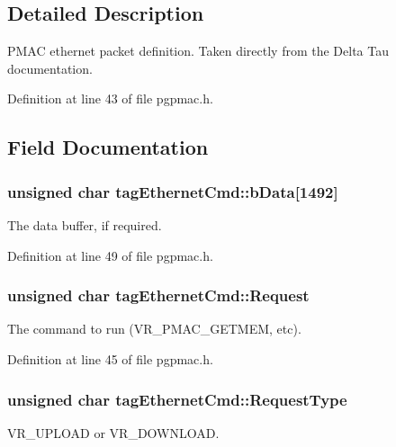\subsection{Detailed Description}
PMAC ethernet packet definition. Taken directly from the Delta Tau documentation. 

Definition at line 43 of file pgpmac.h.

\subsection{Field Documentation}
\hypertarget{structtagEthernetCmd_a872dab798127d6f589974a79c5d0aef1}{
\subsubsection[{bData}]{\setlength{\rightskip}{0pt plus 5cm}unsigned char {\bf tagEthernetCmd::bData}\mbox{[}1492\mbox{]}}}
\label{structtagEthernetCmd_a872dab798127d6f589974a79c5d0aef1}


The data buffer, if required. 

Definition at line 49 of file pgpmac.h.\hypertarget{structtagEthernetCmd_a0dc566e7edbb226f1a4ea443d93d56e2}{
\subsubsection[{Request}]{\setlength{\rightskip}{0pt plus 5cm}unsigned char {\bf tagEthernetCmd::Request}}}
\label{structtagEthernetCmd_a0dc566e7edbb226f1a4ea443d93d56e2}


The command to run (VR\_\-PMAC\_\-GETMEM, etc). 

Definition at line 45 of file pgpmac.h.\hypertarget{structtagEthernetCmd_a6a155eb3ae546dd29369c4a33ddb3310}{
\subsubsection[{RequestType}]{\setlength{\rightskip}{0pt plus 5cm}unsigned char {\bf tagEthernetCmd::RequestType}}}
\label{structtagEthernetCmd_a6a155eb3ae546dd29369c4a33ddb3310}


VR\_\-UPLOAD or VR\_\-DOWNLOAD. 

